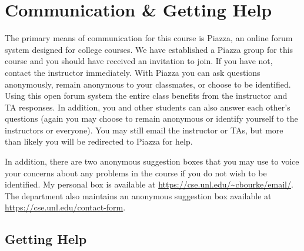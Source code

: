 \documentclass[12pt]{scrartcl}
\begin{document}
\section{Communication \& Getting Help}

The primary means of communication for this course is Piazza, an online
forum system designed for college courses.  We have established a Piazza 
group for this course and you should have received an invitation to join.
If you have not, contact the instructor immediately.  With Piazza you 
can ask questions anonymously, remain anonymous to your classmates, or 
choose to be identified.  Using this open forum system the entire class 
benefits from the instructor and TA responses.  In addition, you and 
other students can also answer each other's questions (again you may
choose to remain anonymous or identify yourself to the instructors or
everyone).  You may still email the instructor or TAs, but more than 
likely you will be redirected to Piazza for help.

In addition, there are two anonymous suggestion boxes that you may 
use to voice your concerns about any problems in the course if you 
do not wish to be identified.  My personal box is available at
\url{https://cse.unl.edu/~cbourke/email/}.  The department also 
maintains an anonymous suggestion box available at 
\url{https://cse.unl.edu/contact-form}.

\subsection{Getting Help}
\end{document}
